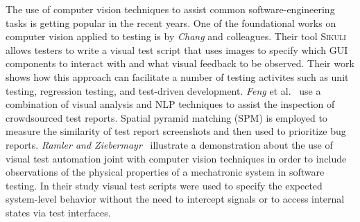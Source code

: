 The use of computer vision techniques to assist common software-engineering tasks is getting popular in the recent years. One of the foundational works on computer vision applied to testing is by \textit{Chang} and colleagues. Their tool \textsc{Sikuli}~\cite{Sikuli} allows testers to write a visual test script that uses images to specify which GUI components to interact with and what visual feedback to be observed. Their work shows how this approach can facilitate a number of testing activites such as unit testing, regression testing, and test-driven development. \textit{Feng} et al.~\cite{Feng:2016:MTR:2970276.2970367} use a combination of visual analysis and NLP techniques to assist the inspection of crowdsourced test reports. Spatial pyramid matching (SPM) is employed to measure the similarity of test report screenshots and then used to prioritize bug reports. 
\textit{Ramler and Ziebermayr}~\cite{2017-Ramler-ICSTW} illustrate a demonstration about the use of visual test automation joint with computer vision techniques in order to include observations of the physical properties of a mechatronic system in software testing. In their study visual test scripts were used to specify the expected system-level behavior without the need to intercept signals or to access internal states via test interfaces.
